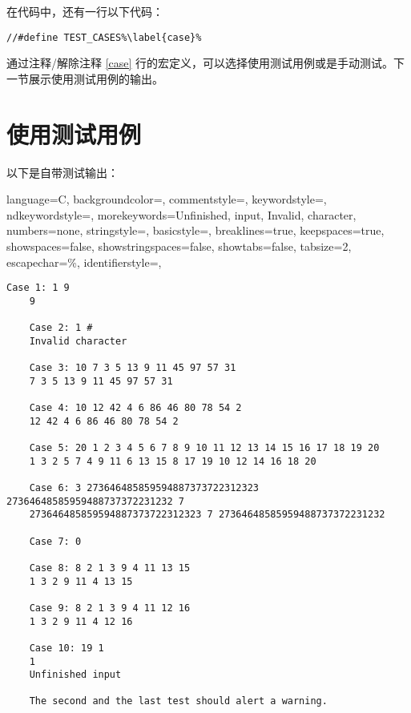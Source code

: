 在代码中，还有一行以下代码：

\begin{lstlisting}[firstnumber=259, escapechar=\%]
//#define TEST_CASES%\label{case}%
\end{lstlisting}

通过注释/解除注释 \ref{case} 行的宏定义，可以选择使用测试用例或是手动测试。下一节展示使用测试用例的输出。
\vspace*{0.4cm}

\section{使用测试用例}

以下是自带测试输出：

 {
    language=C,
    backgroundcolor=\color{CPPDark},   
    commentstyle=\color{CPPLight},
    keywordstyle=\color{red},
    ndkeywordstyle={},
    morekeywords={Unfinished, input, Invalid, character},
    numbers=none,
    stringstyle={},
    basicstyle=\fira\color{white}\footnotesize,
    breaklines=true,                                     
    keepspaces=true,                                     
    showspaces=false,                
    showstringspaces=false,
    showtabs=false,                  
    tabsize=2,
    escapechar=\%,
    identifierstyle={},
}

\begin{lstlisting}[style=console, caption={使用自带样例的输出}]
    Case 1: 1 9
    9 
    
    Case 2: 1 #
    Invalid character
    
    Case 3: 10 7 3 5 13 9 11 45 97 57 31
    7 3 5 13 9 11 45 97 57 31 
    
    Case 4: 10 12 42 4 6 86 46 80 78 54 2
    12 42 4 6 86 46 80 78 54 2 
    
    Case 5: 20 1 2 3 4 5 6 7 8 9 10 11 12 13 14 15 16 17 18 19 20
    1 3 2 5 7 4 9 11 6 13 15 8 17 19 10 12 14 16 18 20 
    
    Case 6: 3 273646485859594887373722312323 27364648585959488737372231232 7
    273646485859594887373722312323 7 27364648585959488737372231232 
    
    Case 7: 0 
    
    Case 8: 8 2 1 3 9 4 11 13 15
    1 3 2 9 11 4 13 15 
    
    Case 9: 8 2 1 3 9 4 11 12 16
    1 3 2 9 11 4 12 16 
    
    Case 10: 19 1
    1 
    Unfinished input
    
    The second and the last test should alert a warning.
\end{lstlisting}



